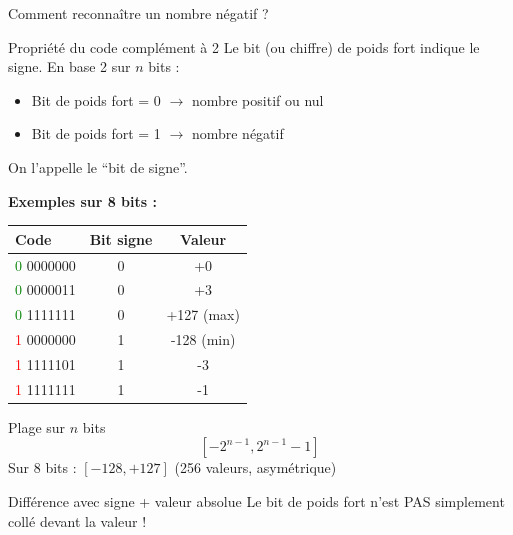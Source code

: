 \documentclass[aspectratio=1610]{beamer}
\begin{document}
\begin{frame}[allowframebreaks]{Comment reconnaître un nombre négatif ?}

  \begin{block}{Propriété du code complément à 2}
    Le bit (ou chiffre) de poids fort indique le signe. En base 2 sur $n$ bits :
    \begin{itemize}
      \item Bit de poids fort = 0 $\rightarrow$ nombre positif ou nul
      \item Bit de poids fort = 1 $\rightarrow$ nombre négatif
    \end{itemize}

    On l'appelle le ``bit de signe''.
  \end{block}

  \textbf{Exemples sur 8 bits :}
  \begin{center}
    \begin{tabular}{lcc}
      \hline
      \textbf{Code} & \textbf{Bit signe} & \textbf{Valeur} \\
      \hline
      \textcolor{green}{0} 0000000 & 0 & +0 \\
      \textcolor{green}{0} 0000011 & 0 & +3 \\
      \textcolor{green}{0} 1111111 & 0 & +127 (max) \\
      \textcolor{red}{1} 0000000 & 1 & -128 (min) \\
      \textcolor{red}{1} 1111101 & 1 & -3 \\
      \textcolor{red}{1} 1111111 & 1 & -1 \\
      \hline
    \end{tabular}
  \end{center}

  \begin{block}{Plage sur $n$ bits}
    \[
      \left[ -2^{n-1} , 2^{n-1} - 1 \right]
    \]
    Sur 8 bits : $[-128, +127]$ (256 valeurs, asymétrique)
  \end{block}

  \begin{alertblock}{Différence avec signe + valeur absolue}
    Le bit de poids fort n'est PAS simplement collé devant la valeur !
  \end{alertblock}

\end{frame}
\end{document}
